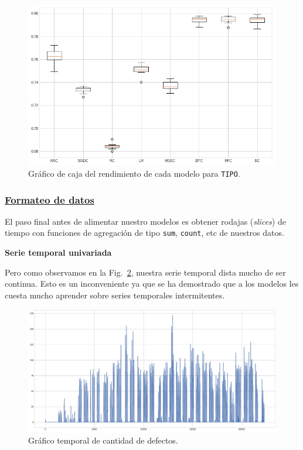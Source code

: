 \documentclass[a4paper,12pt]{article}
\begin{document}
\begin{figure}[H]
	\begin{center}
	\includegraphics[width=1\textwidth]{tesis_72.png}
  	\caption{Gráfico de caja del rendimiento de cada modelo para \texttt{TIPO}.}
  	\label{fig:perfmodeluet}
  	\end{center}
\end{figure}

\subsubsection{\href{https://github.com/GeraCollante/tesis-icomp-machinelearning/blob/main/DataFormatting.ipynb}{\color{blue}Formateo de datos}}

El paso final antes de alimentar nuestro modelos es obtener rodajas (\textit{slices}) de tiempo con funciones de agregación de tipo \texttt{sum}, \texttt{count}, etc de nuestros datos. 

\hfill
\textbf{Serie temporal univariada}

Pero como observamos en la Fig.~\ref{fig:graf_cantdef_antes}, nuestra serie temporal dista mucho de ser continua. Esto es un inconveniente ya que se ha demostrado que a los modelos les cuesta mucho aprender sobre series temporales intermitentes.

\begin{figure}[H]
	\begin{center}
	\includegraphics[width=1\textwidth]{tesis_78.png}
  	\caption{Gráfico temporal de cantidad de defectos.}
  	\label{fig:graf_cantdef_antes}
  	\end{center}
\end{figure}
\end{document}

